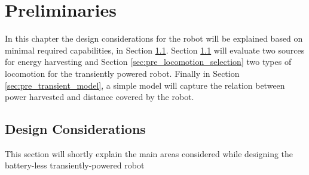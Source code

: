\chapter{Preliminaries}
\label{cap:preliminaries}

In this chapter the design considerations for the robot will be explained based on minimal required capabilities, in Section \ref{sec:pre_design_considerations}.
Section \ref{sec:pre_design_considerations} will evaluate two sources for energy harvesting and Section \ref{sec:pre_locomotion_selection} two types of locomotion for the transiently powered robot.
Finally in Section \ref{sec:pre_transient_model}, a simple model will capture the relation between power harvested and distance covered by the robot.

\section{Design Considerations}
\label{sec:pre_design_considerations}

This section will shortly explain the main areas considered while designing the battery-less transiently-powered robot



